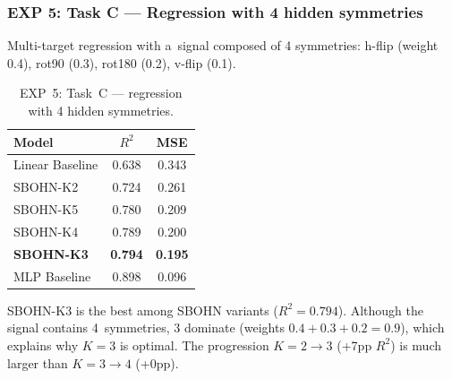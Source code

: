 \subsubsection*{EXP 5: Task C --- Regression with 4 hidden symmetries}

Multi-target regression with a~signal composed of 4 symmetries: h-flip (weight 0.4), rot90 (0.3), rot180 (0.2), v-flip (0.1).

\begin{table}[h]
\centering
\caption{EXP~5: Task~C --- regression with 4 hidden symmetries.}
\begin{tabular}{lcc}
\hline
\textbf{Model} & $R^2$ & \textbf{MSE} \\
\hline
Linear Baseline   & 0.638 & 0.343 \\
SBOHN-K2          & 0.724 & 0.261 \\
SBOHN-K5          & 0.780 & 0.209 \\
SBOHN-K4          & 0.789 & 0.200 \\
\textbf{SBOHN-K3} & \textbf{0.794} & \textbf{0.195} \\
MLP Baseline      & 0.898 & 0.096 \\
\hline
\end{tabular}
\end{table}

SBOHN-K3 is the best among SBOHN variants ($R^2=0.794$). Although the signal contains 4~symmetries, 3 dominate (weights $0.4+0.3+0.2=0.9$), which explains why $K=3$ is optimal. The progression $K=2 \to 3$ (+7pp $R^2$) is much larger than $K=3 \to 4$ (+0pp).
